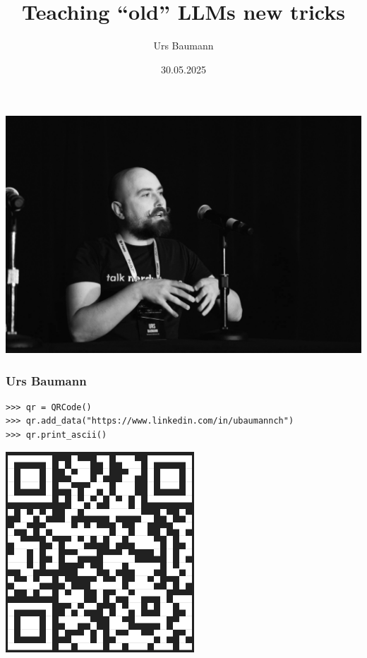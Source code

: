 \documentclass[aspectratio=169]{beamer}
\title{Teaching ``old'' LLMs new tricks}
\author{Urs Baumann}
\institute{Swisscom}
\date{30.05.2025}
\begin{document}
{
{
  \includegraphics[height=\paperheight]{images/AutoCon_0-108.jpg}
}
\frame{\titlepage}
}


\begin{frame}[fragile]
  \frametitle{Urs Baumann}

  \begin{verbatim}
>>> qr = QRCode()
>>> qr.add_data("https://www.linkedin.com/in/ubaumannch")
>>> qr.print_ascii()
  \end{verbatim}

  \includegraphics[height = 0.6\textheight]{images/qrcode.png}

\end{frame}
\end{document}
